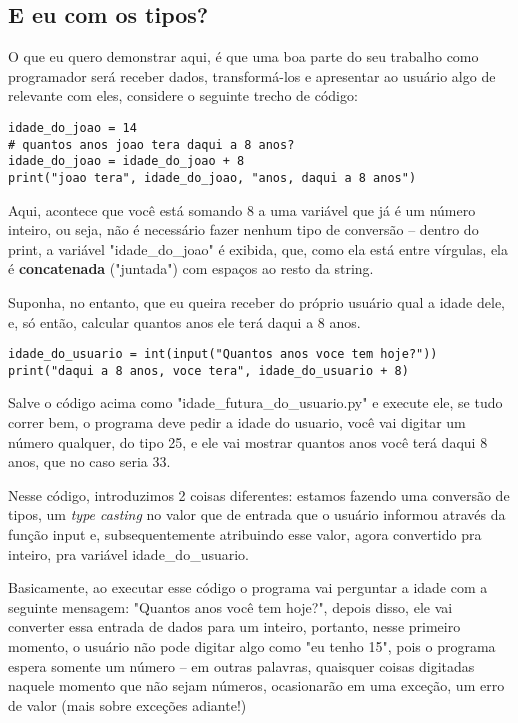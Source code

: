 \documentclass[12pt]{book}
\begin{document}
	\subsection{E eu com os tipos?}
	
	O que eu quero demonstrar aqui, é que uma boa parte do seu trabalho como programador será receber dados, transformá-los e apresentar ao usuário algo de relevante com eles, considere o seguinte trecho de código:
	
	\begin{lstlisting}[caption={uma conta simples}] 
idade_do_joao = 14
# quantos anos joao tera daqui a 8 anos?
idade_do_joao = idade_do_joao + 8
print("joao tera", idade_do_joao, "anos, daqui a 8 anos")\end{lstlisting}
	
	Aqui, acontece que você está somando 8 a uma variável que já é um número inteiro, ou seja, não é necessário fazer nenhum tipo de conversão -- dentro do print, a variável "idade\_do\_joao" é exibida, que, como ela está entre vírgulas, ela é \textbf{concatenada} ("juntada") com espaços ao resto da string. 
	
	Suponha, no entanto, que eu queira receber do próprio usuário qual a idade dele, e, só então, calcular quantos anos ele terá daqui a 8 anos.
	
	\begin{lstlisting}[caption={Calculando a idade futura do usuário}]
idade_do_usuario = int(input("Quantos anos voce tem hoje?"))
print("daqui a 8 anos, voce tera", idade_do_usuario + 8)\end{lstlisting}
	
	Salve o código acima como "idade\_futura\_do\_usuario.py" e execute ele, se tudo correr bem, o programa deve pedir a idade do usuario, você vai digitar um número qualquer, do tipo 25, e ele vai mostrar quantos anos você terá daqui 8 anos, que no caso seria 33.
	
	Nesse código, introduzimos 2 coisas diferentes: estamos fazendo uma conversão de tipos, um \textit{type casting} no valor que de entrada que o usuário informou através da função input e, subsequentemente atribuindo esse valor, agora convertido pra inteiro, pra variável idade\_do\_usuario.
	
	Basicamente, ao executar esse código o programa vai perguntar a idade com a seguinte mensagem: "Quantos anos você tem hoje?", depois disso, ele vai converter essa entrada de dados para um inteiro, portanto, nesse primeiro momento, o usuário não pode digitar algo como "eu tenho 15", pois o programa espera somente um número -- em outras palavras, quaisquer coisas digitadas naquele momento que não sejam números, ocasionarão em uma exceção, um erro de valor (mais sobre exceções adiante!)
	
\end{document}
